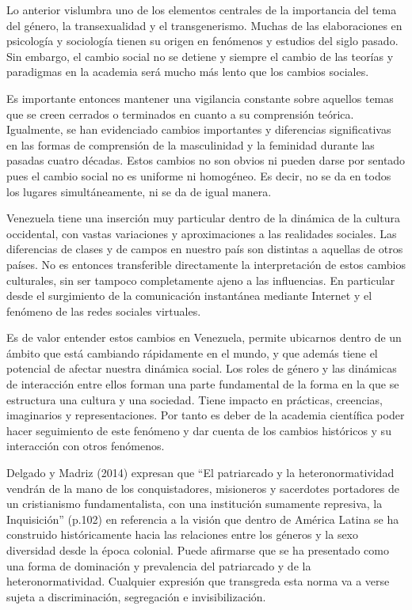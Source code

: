 Lo anterior vislumbra uno de los elementos centrales de la importancia del tema
del género, la transexualidad y el transgenerismo.
Muchas de las elaboraciones en psicología y sociología tienen su origen en
fenómenos y estudios del siglo pasado.
Sin embargo, el cambio social no se detiene y siempre el cambio de las teorías y
paradigmas en la academia será mucho más lento que los cambios sociales.

Es importante entonces mantener una vigilancia constante sobre aquellos temas
que se creen cerrados o terminados en cuanto a su comprensión teórica.
Igualmente, se han evidenciado cambios importantes y diferencias significativas
en las formas de comprensión de la masculinidad y la feminidad durante las
pasadas cuatro décadas.
Estos cambios no son obvios ni pueden darse por sentado pues el cambio social no
es uniforme ni homogéneo.
Es decir, no se da en todos los lugares simultáneamente, ni se da de igual
manera.

Venezuela tiene una inserción muy particular dentro de la dinámica de la cultura
occidental, con vastas variaciones y aproximaciones a las realidades sociales.
Las diferencias de clases y de campos en nuestro país son distintas a aquellas
de otros países.
No es entonces transferible directamente la interpretación de estos cambios
culturales, sin ser tampoco completamente ajeno a las influencias.
En particular desde el surgimiento de la comunicación instantánea mediante
Internet y el fenómeno de las redes sociales virtuales.

Es de valor entender estos cambios en Venezuela, permite ubicarnos dentro de un
ámbito que está cambiando rápidamente en el mundo, y que además tiene el
potencial de afectar nuestra dinámica social.
Los roles de género y las dinámicas de interacción entre ellos forman una parte
fundamental de la forma en la que se estructura una cultura y una sociedad.
Tiene impacto en prácticas, creencias, imaginarios y representaciones.
Por tanto es deber de la academia científica poder hacer seguimiento de este
fenómeno y dar cuenta de los cambios históricos y su interacción con otros
fenómenos.

Delgado y Madriz (2014) expresan que “El patriarcado y la heteronormatividad
vendrán de la mano de los conquistadores, misioneros y sacerdotes portadores de
un cristianismo fundamentalista, con una institución sumamente represiva, la
Inquisición” (p.102) en referencia a la visión que dentro de América Latina se ha construido
históricamente hacia las relaciones entre los géneros y la sexo diversidad desde
la época colonial.
Puede afirmarse que se ha presentado como una forma de dominación y prevalencia
del patriarcado y de la heteronormatividad.
Cualquier expresión que transgreda esta norma va a verse sujeta a
discriminación, segregación e invisibilización.


